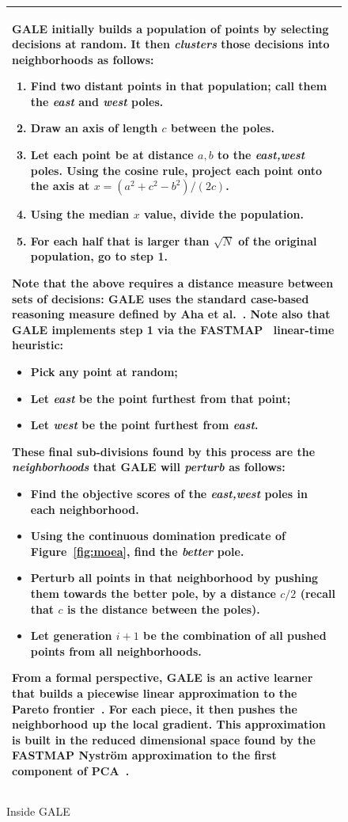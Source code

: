 \documentclass[journal]{IEEEtran}
\newcommand{\fig}[1]{Figure~\ref{fig:#1}}
\begin{document}
\begin{figure}
\small
\begin{tabular}{|p{.95\linewidth}|}\hline
GALE initially builds a population of points by selecting
decisions at random. 
It then {\em clusters} those decisions into neighborhoods as follows:
\begin{enumerate}
\item
Find two distant points in that population; call them the {\em east} and {\em west} poles. 
\item 
Draw an axis of length $c$ between the poles. 
\item
Let each point be at distance $a,b$ to the {\em east,west} poles.
Using the cosine rule, project each point onto the  axis  at $x=(a^2 + c^2 - b^2)/(2c)$.  
\item 
Using the median $x$ value, divide the population.
\item
For each half that is larger than $\sqrt{N}$ of the original population, go to step 1.
\end{enumerate}
Note that the above requires a distance measure between sets of decisions: GALE uses the standard case-based reasoning measure defined by Aha et al.~\cite{aha91}. 
Note also that GALE implements step 1 via  the FASTMAP~\cite{Faloutsos1995} linear-time heuristic:
\begin{itemize}
\item
Pick any point at random; 
\item Let {\em east} be the point furthest from that point; 
\item Let {\em west} be the point furthest from {\em east}.
\end{itemize}
These final sub-divisions found by this process are the {\em neighborhoods} that
GALE will {\em perturb} as follows:
\begin{itemize}
\item
Find the objective scores of the {\em east,west} poles in each neighborhood.
\item 
Using the continuous domination predicate of \fig{moea}, find  the {\em better} pole. 
\item
Perturb all points in that neighborhood by pushing them towards the better pole, by a distance  $c/2$ (recall that  $c$ is the distance between the poles).
\item
Let generation $i+1$ be the combination of all pushed points from all neighborhoods.
\end{itemize}
From a formal perspective, GALE is an active learner~\cite{Dasgupta2005} that builds a piecewise linear approximation to the Pareto frontier~\cite{Zuluaga:13}.
For each piece, it then pushes the neighborhood up the local gradient.
This  approximation is built in the reduced dimensional space found by the FASTMAP  Nystr\"om approximation to the first component of PCA~\cite{platt05}.
\\\hline
\end{tabular}
\caption{Inside GALE}\label{fig:gale}
\end{figure}
\end{document}
